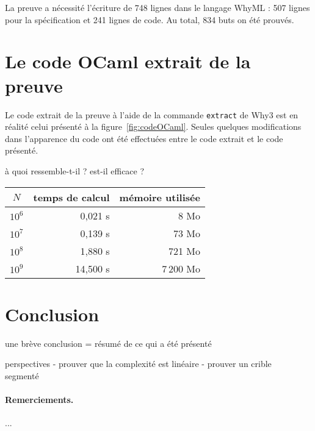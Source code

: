 \documentclass[a4paper]{easychair}
\begin{document}
La preuve a nécessité l'écriture de 748 lignes dans le langage WhyML :
507 lignes pour la spécification et 241 lignes de code.
Au total, 834 buts on été prouvés.



\section{Le code OCaml extrait de la preuve}
\label{sec:extraction}

Le code extrait de la preuve à l'aide de la commande \texttt{extract} de Why3
est en réalité celui présenté à la figure~\ref{fig:codeOCaml}.
Seules quelques modifications dans l'apparence du code ont été effectuées
entre le code extrait et le code présenté.

à quoi ressemble-t-il ?
est-il efficace ?

\begin{center}
  \begin{tabular}{|c|r|r|}
    \hline
    $N$ & temps de calcul & mémoire utilisée \\
    \hline\hline
    $10^6$ &  0,021 s &      8 Mo \\\hline
    $10^7$ &  0,139 s &     73 Mo \\\hline
    $10^8$ &  1,880 s &    721 Mo \\\hline
    $10^9$ & 14,500 s & 7\,200 Mo \\\hline
  \end{tabular}
\end{center}

\section{Conclusion}
\label{sec:conclusion}

une brève conclusion = résumé de ce qui a été présenté

perspectives
- prouver que la complexité est linéaire
- prouver un crible segmenté~\cite{crible-segmente}


\paragraph{Remerciements.} ...



\end{document}
